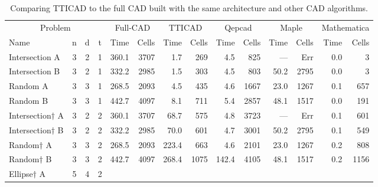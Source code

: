 \documentclass{article}
\begin{document}
\begin{sidewaystable*}
\caption{Comparing TTICAD to the full CAD built with the same architecture and other CAD algorithms.} \begin{center}
\label{table:CADW:TTICAD}
\begin{tabular}{lccc|rr|rr|rr|rr|rr}
  \multicolumn{4}{c|}{Problem} 
& \multicolumn{2}{|c|}{Full-CAD} & \multicolumn{2}{|c|}{TTICAD} 
& \multicolumn{2}{|c|}{{\sc Qepcad}} & \multicolumn{2}{|c|}{{\sc Maple}}  
& \multicolumn{2}{|c}{{\sc Mathematica}} \\
Name & n & d & t
                        &  Time      &  Cells      &  Time      &  Cells       
                        &  Time      &  Cells      &  Time      &  Cells       
                        &  Time      &  Cells \\
\hline
Intersection A          & 3 & 2 & 1
						& 360.1     &  3707       &  1.7       &  269         
						& 4.5       &  825        &  ---       &  Err     
						& 0.0 & 3   \\
Intersection B          & 3 & 2 & 1
						& 332.2     &  2985       &  1.5       &  303         
						& 4.5       &  803        &  50.2      &  2795    
						& 0.0 & 3   \\
Random A                & 3 & 3 & 1
						& 268.5     &  2093       &  4.5       &  435         
						& 4.6       &  1667       &  23.0      &  1267    
						& 0.1 & 657 \\
Random B                & 3 & 3 & 1
						& 442.7     &  4097       &  8.1       &  711         
						& 5.4       &  2857       &  48.1      &  1517    
						& 0.0 & 191 \\ 
Intersection$\dagger$ A & 3 & 2 & 2
						&  360.1     &  3707       &  68.7      &  575         
						&  4.8       &  3723       &  ---       &  Err     
						& 0.1 & 601 \\
Intersection$\dagger$ B & 3 & 2 & 2
						&  332.2     &  2985       &  70.0      &  601         
						&  4.7       &  3001       &  50.2      &  2795    
						& 0.1 & 549 \\
Random$\dagger$ A       & 3 & 3 & 2
						&  268.5     &  2093       &  223.4     &  663         
						&  4.6       &  2101       &  23.0      &  1267    
						& 0.2 & 808 \\
Random$\dagger$ B       & 3 & 3 & 2
						&  442.7     &  4097       &  268.4     &  1075        
						&  142.4     &  4105       &  48.1      &  1517    
						& 0.2 & 1156 \\
Ellipse$\dagger$ A      & 5 & 4 & 2

\end{tabular}
\end{center}
\end{sidewaystable*}
\end{document}
